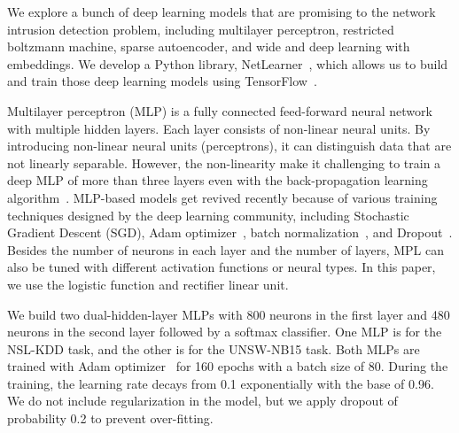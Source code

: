 \label{CDL:Sec:Architectures}

We explore a bunch of deep learning models that are promising to the
network intrusion detection problem, including multilayer perceptron, restricted boltzmann machine, sparse autoencoder, and wide and deep learning with embeddings. We develop a Python library, NetLearner~\cite{NetLearner}, which allows us to build and train those deep learning models using TensorFlow~\cite{TensorFlow}.

\label{CDL:SubSec:MLP}
Multilayer perceptron (MLP) is a fully connected feed-forward neural network with multiple hidden layers.
Each layer consists of non-linear neural units.
By introducing non-linear neural units (perceptrons), it can distinguish data that are not linearly separable.
However, the non-linearity make it challenging to train a deep MLP of more than three layers even with the back-propagation learning algorithm~\cite{Backpropagation}.
MLP-based models get revived recently because of various training techniques designed by the deep learning community, including Stochastic Gradient Descent (SGD), Adam optimizer~\cite{Adam},
batch normalization~\cite{BatchNorm}, and Dropout~\cite{Dropout}.
Besides the number of neurons in each layer and the number of layers,
MPL can also be tuned with different activation functions or neural types.
In this paper, we use the logistic function and rectifier linear unit.

We build two dual-hidden-layer MLPs with 800 neurons in the first layer and 480 neurons in the second layer followed by a softmax classifier.
One MLP is for the NSL-KDD task, and the other is for the UNSW-NB15 task.
Both MLPs are trained with Adam optimizer~\cite{Adam} for 160 epochs with a batch size of 80.
During the training, the learning rate decays from 0.1 exponentially with the base of 0.96.
We do not include regularization in the model, but we apply dropout of probability 0.2 to prevent over-fitting.


